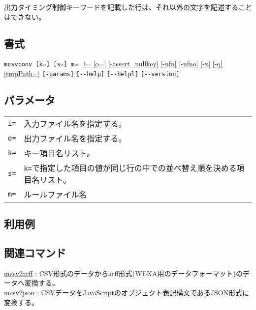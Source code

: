 出力タイミング制御キーワードを記載した行は、それ以外の文字を記述することはできない。

\subsection*{書式}
\verb/mcsvconv [k=] [s=] m= /
\hyperref[sect:option_i]{i=}
\hyperref[sect:option_o]{[o=]}
\hyperref[sect:option_assert_nullkey]{[-assert\_nullkey]}
\hyperref[sect:option_nfn]{[-nfn]}
\hyperref[sect:option_nfno]{[-nfno]}
\hyperref[sect:option_x]{[-x]}
\hyperref[sect:option_q]{[-q]}
\hyperref[sect:option_option_tmppath]{[tmpPath=]}
\verb|[-params]|
\verb|[--help]|
\verb|[--helpl]|
\verb|[--version]|\\

\subsection*{パラメータ}
\begin{table}[htbp]
{\small
\begin{tabular}{ll}
\verb|i=|    & 入力ファイル名を指定する。\\
\verb|o=|    & 出力ファイル名を指定する。\\
\verb|k=|    & キー項目名リスト。\\
\verb|s=|    & \verb|k=|で指定した項目の値が同じ行の中での並べ替え順を決める項目名リスト。\\
\verb|m=|    & ルールファイル名\\
\end{tabular} 
}
\end{table} 


\subsection*{利用例}


\subsection*{関連コマンド}
\hyperref[sect:mcsv2arff]{mcsv2arff} : CSV形式のデータからarff形式(WEKA用のデータフォーマット)のデータへ変換する。\\
\hyperref[sect:mcsv2json]{mcsv2json} : CSVデータをJavaScriptのオブジェクト表記構文であるJSON形式に変換する。\\

%
